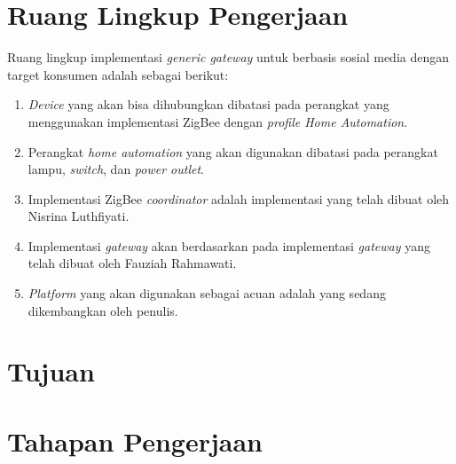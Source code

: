 \section{Ruang Lingkup Pengerjaan}
Ruang lingkup implementasi \textit{generic gateway} untuk \plat \iot berbasis sosial media dengan target konsumen \eu adalah sebagai berikut:
\begin{enumerate}
	\item \textit{Device} yang akan bisa dihubungkan dibatasi pada perangkat yang menggunakan implementasi ZigBee dengan \textit{profile Home Automation}.
	\item Perangkat \textit{home automation} yang akan digunakan dibatasi pada perangkat lampu, \textit{switch}, dan \textit{power outlet}. 
	\item Implementasi ZigBee \textit{coordinator} adalah implementasi yang telah dibuat oleh Nisrina Luthfiyati\cite{2}.
	\item Implementasi \textit{gateway} akan berdasarkan pada implementasi \textit{gateway} yang telah dibuat oleh Fauziah Rahmawati\cite{3}.
	\item \textit{Platform} yang akan digunakan sebagai acuan adalah \plat yang sedang dikembangkan oleh penulis.
	
\end{enumerate}

\section{Tujuan}

\section{Tahapan Pengerjaan}


